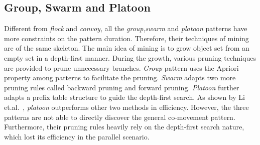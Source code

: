 \subsection{Group, Swarm and Platoon}
Different from \emph{flock} and \emph{convoy}, all the \emph{group},\emph{swarm} and \emph{platoon}
patterns have more constraints on the pattern duration. Therefore, their techniques of mining are of
the same skeleton. The main idea of mining is to grow object set from an empty set
in a depth-first manner. During the growth, various pruning techniques are provided to prune 
unnecessary branches. \emph{Group} pattern uses the Apriori property among patterns to facilitate the pruning.
\emph{Swarm} adapts two more pruning rules called backward pruning and forward pruning. \emph{Platoon}
further adapts a prefix table structure to guide the depth-first search. As shown by Li et.al.~\cite{li2015platoon},
\emph{platoon} outperforms other two methods in efficiency. 
However, the three patterns are not able to directly discover the general co-movement pattern.
Furthermore, their pruning rules heavily rely on the depth-first search nature, which lost its efficiency
in the parallel scenario.



